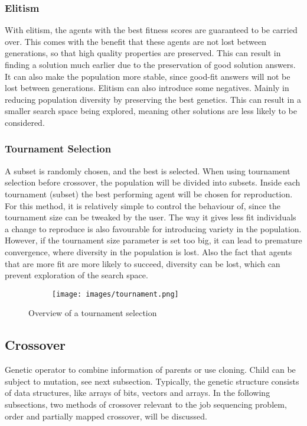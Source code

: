\documentclass{article}
\begin{document}
\bigskip
\subsubsection{Elitism}
With elitism, the agents with the best fitness scores are guaranteed to be carried over. This comes with the benefit that these agents are not lost between generations, so that high quality properties are preserved. This can result in finding a solution much earlier due to the preservation of good solution answers. It can also make the population more stable, since good-fit answers will not be lost between generations.\smallskip
Elitism can also introduce some negatives. Mainly in reducing population diversity by preserving the best genetics. This can result in a smaller search space being explored, meaning other solutions are less likely to be considered.

\bigskip
\subsubsection{Tournament Selection}
A subset is randomly chosen, and the best is selected. When using tournament selection before crossover, the population will be divided into subsets. Inside each tournament (subset) the best performing agent will be chosen for reproduction. For this method, it is relatively simple to control the behaviour of, since the tournament size can be tweaked by the user. The way it gives less fit individuals a change to reproduce is also favourable for introducing variety in the population.\smallskip 
However, if the tournament size parameter is set too big, it can lead to premature convergence, where diversity in the population is lost. Also the fact that agents that are more fit are more likely to succeed, diversity can be lost, which can prevent exploration of the search space.

\begin{figure}
  \centering
  \begin{subfigure}[H]{0.5\linewidth}
    \texttt{[image: images/tournament.png]}
  \end{subfigure}
  \caption{Overview of a tournament selection}
  \label{fig:tournament}
\end{figure}

\newpage
\subsection{Crossover}
Genetic operator to combine information of parents or use cloning. Child can be subject to mutation, see next subsection. Typically, the genetic structure consists of data structures, like arrays of bits, vectors and arrays.\smallbreak
In the following subsections, two methods of crossover relevant to the job sequencing problem, order and partially mapped crossover, will be discussed.
\end{document}
